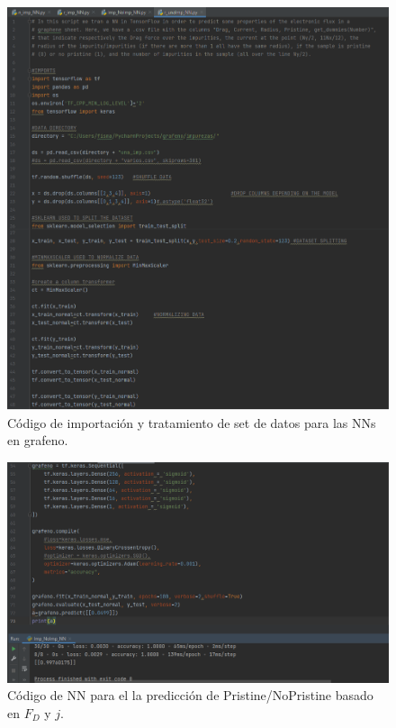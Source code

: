 \documentclass{article}
\begin{document}
\begin{figure}[th!]
\centering
   \includegraphics[width=1.\textwidth]{prog_grafeno.png}
   \caption{Código de importación y tratamiento de set de datos para las NNs en grafeno.}
\end{figure}
\begin{figure}[th!]
\centering
   \includegraphics[width=1.\textwidth]{I_NI_NN.png}
   \caption{Código de NN para el la predicción de Pristine/NoPristine basado en $F_D$ y $j$.}
\end{figure}
\end{document}
